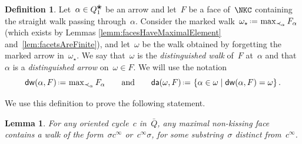 \documentclass{amsart}
\newtheorem{lemma}[theorem]{Lemma}
\theoremstyle{definition}
\newtheorem{definition}[theorem]{Definition}
\newcommand{\set}[2]{\left\{ #1 \;\middle|\; #2 \right\}} %
\newcommand{\eqdef}{\mbox{\,\raisebox{0.2ex}{\scriptsize\ensuremath{\mathrm:}}\ensuremath{=}\,}} %
\newcommand{\darkblue}{\color{darkblue}} %
\newcommand{\defn}[1]{\textsl{\darkblue #1}} %
\newcommand{\blossom}{^\text{\ding{96}}} %
\newcommand{\distinguishedWalk}[2]{\mathsf{dw}(#1,#2)} %
\newcommand{\distinguishedArrows}[2]{\mathsf{da}(#1,#2)} %
\begin{document}
\begin{definition}
\label{defi:distinguishedWalksAndArrows}
Let~$\alpha \in Q\blossom_1$ be an arrow and let~$F$ be a face of~$\NKC$ containing the straight walk passing through~$\alpha$.
Consider the marked walk~$\omega_\star \eqdef \max_{\prec_\alpha} F_\alpha$ (which exists by Lemmas \ref{lemm:facesHaveMaximalElement} and~\ref{lem:facetsAreFinite}),
and let~$\omega$ be the walk obtained by forgetting the marked arrow in~$\omega_\star$. 
We say that~$\omega$ is the \defn{distinguished walk} of~$F$ at~$\alpha$ and that~$\alpha$ is a \defn{distinguished arrow} on~$\omega \in F$.
We will use the notation
\[
\distinguishedWalk{\alpha}{F} \eqdef \max\nolimits_{\prec_\alpha} F_\alpha
\qquad\text{and}\qquad
\distinguishedArrows{\omega}{F} \eqdef \set{\alpha \in \omega}{\distinguishedWalk{\alpha}{F} = \omega}.
\]
\end{definition}

We use this definition to prove the following statement.

\begin{lemma}
\label{lem:walksThroughcycles}
For any oriented cycle~$c$ in~$\bar Q$, any maximal non-kissing face contains a walk of the form~$\sigma c^\infty$ or~$c^\infty\sigma$, for some substring~$\sigma$ distinct from~$c^\infty$.
\end{lemma}
\end{document}
